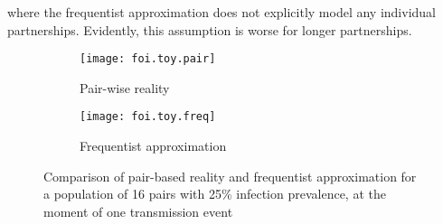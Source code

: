where the frequentist approximation does not explicitly model any individual partnerships.
Evidently, this assumption is worse for longer partnerships.
\begin{figure}
  \begin{subfigure}{.5\linewidth}
    \centering\texttt{[image: foi.toy.pair]}
    \caption{Pair-wise reality}
    \label{fig:foi.toy.pair}
  \end{subfigure}%
  \begin{subfigure}{.5\linewidth}
    \centering\texttt{[image: foi.toy.freq]}
    \caption{Frequentist approximation}
    \label{fig:foi.toy.freq}
  \end{subfigure}
  \caption{Comparison of pair-based reality and frequentist approximation
    for a population of 16 pairs with 25\% infection prevalence,
    at the moment of one transmission event}
  \label{fig:foi.toy}
\end{figure}
